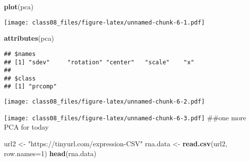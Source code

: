 \documentclass[
]{article}
\newenvironment{Shaded}{\begin{snugshade}}{\end{snugshade}}
\newcommand{\CommentTok}[1]{\textcolor[rgb]{0.56,0.35,0.01}{\textit{#1}}}
\newcommand{\DataTypeTok}[1]{\textcolor[rgb]{0.13,0.29,0.53}{#1}}
\newcommand{\DecValTok}[1]{\textcolor[rgb]{0.00,0.00,0.81}{#1}}
\newcommand{\KeywordTok}[1]{\textcolor[rgb]{0.13,0.29,0.53}{\textbf{#1}}}
\newcommand{\NormalTok}[1]{#1}
\newcommand{\OperatorTok}[1]{\textcolor[rgb]{0.81,0.36,0.00}{\textbf{#1}}}
\newcommand{\StringTok}[1]{\textcolor[rgb]{0.31,0.60,0.02}{#1}}
\begin{document}
\begin{Shaded}
\begin{Highlighting}[]
\KeywordTok{plot}\NormalTok{(pca)}
\end{Highlighting}
\end{Shaded}

\texttt{[image: class08\_files/figure-latex/unnamed-chunk-6-1.pdf]}

\begin{Shaded}
\begin{Highlighting}[]
\KeywordTok{attributes}\NormalTok{(pca)}
\end{Highlighting}
\end{Shaded}

\begin{verbatim}
## $names
## [1] "sdev"     "rotation" "center"   "scale"    "x"       
## 
## $class
## [1] "prcomp"
\end{verbatim}

\begin{Shaded}
\end{Shaded}

\texttt{[image: class08\_files/figure-latex/unnamed-chunk-6-2.pdf]}

\begin{Shaded}
\end{Shaded}

\texttt{[image: class08\_files/figure-latex/unnamed-chunk-6-3.pdf]}
\#\#one more PCA for today

\begin{Shaded}
\begin{Highlighting}[]
\NormalTok{url2 <-}\StringTok{ "https://tinyurl.com/expression-CSV"}
\NormalTok{rna.data <-}\StringTok{ }\KeywordTok{read.csv}\NormalTok{(url2, }\DataTypeTok{row.names=}\DecValTok{1}\NormalTok{)}
\KeywordTok{head}\NormalTok{(rna.data)}
\end{Highlighting}
\end{Shaded}
\end{document}
